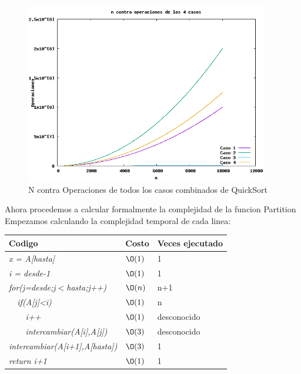 \documentclass[spanish]{article}
\begin{document}
	\begin{figure}[H]
		\centering
		\includegraphics[width=400px,height=300px]{grafica7}
		\caption{N contra Operaciones de todos los casos combinados de QuickSort}
	\end{figure}	
	Ahora procedemos a calcular formalmente la complejidad de la funcion Partition
	Empezamos calculando la complejidad temporal de cada linea:
	\begin{center}
		\begin{table}[H]
			\begin{tabular}{|l|l|l|}
				\hline
				\rowcolor[HTML]{FFCC67} 
				Codigo                           & Costo & Veces ejecutado \\ \hline
				\textit{x = A[hasta]}                    & $\O(1)$    & 1               \\ \hline
				\textit{i = desde-1}                    & $\O(1)$    & 1               \\ \hline
				\textit{for(j=desde;j$<$hasta;j++)} & $\O(n)$    & n+1             \\ \hline
				\textit{\  \  if(A[j]<i)}                 & $\O(1)$    & n               \\ \hline
				\textit{\  \  \  \  i++}                     & $\O(1)$    & desconocido               \\ \hline
				\textit{\  \  \  \  intercambiar(A[i],A[j])}                     & $\O(3)$    & desconocido               \\ \hline
				\textit{intercambiar(A[i+1],A[hasta])}                     & $\O(3)$    & 1               \\ \hline
				\textit{return i+1}                & $\O(1)$    & 1               \\ \hline
			\end{tabular}
		\end{table}										
	\end{center}
\end{document}

